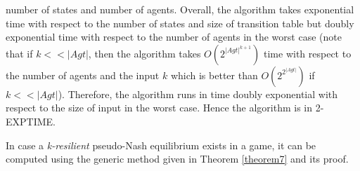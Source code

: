 number of states and number of agents. Overall, the algorithm takes exponential time with respect to the number of states and size of transition table but doubly exponential time with respect to the number of agents in the worst case (note that if $k << \vert Agt \vert$, then the algorithm takes $O(2^{\vert Agt \vert^{k+1}})$ time with respect to the number of agents and the input $k$ which is better than $O(2^{2^{\vert Agt \vert}})$ if $k << \vert Agt \vert$). Therefore, the algorithm runs in time doubly exponential with respect to the size of input in the worst case. Hence the algorithm is in 2-EXPTIME.

In case a \textit{k-resilient} pseudo-Nash equilibrium exists in a game, it can be computed using the generic method given in Theorem \ref{theorem7} and its proof.